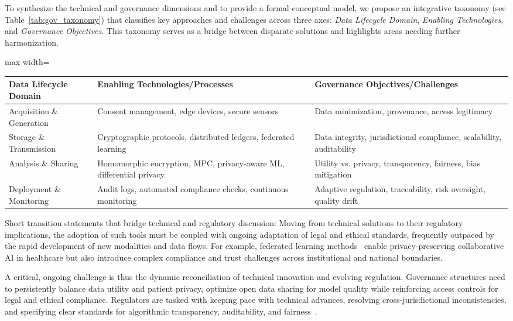 \documentclass[sigconf]{acmart}
\begin{document}
To synthesize the technical and governance dimensions and to provide a formal conceptual model, we propose an integrative taxonomy (see Table~\ref{tab:gov_taxonomy}) that classifies key approaches and challenges across three axes: \emph{Data Lifecycle Domain}, \emph{Enabling Technologies}, and \emph{Governance Objectives}. This taxonomy serves as a bridge between disparate solutions and highlights areas needing further harmonization.

\begin{table*}[htbp]
\centering
\caption{Taxonomy Bridging Technical and Governance Strategies in Digital Health Data Infrastructures}
\label{tab:gov_taxonomy}
\begin{adjustbox}{max width=\textwidth}
\begin{tabular}{@{}lll@{}}
\toprule
\textbf{Data Lifecycle Domain} & \textbf{Enabling Technologies/Processes} & \textbf{Governance Objectives/Challenges} \\
\midrule
Acquisition \& Generation & Consent management, edge devices, secure sensors & Data minimization, provenance, access legitimacy \\
Storage \& Transmission & Cryptographic protocols, distributed ledgers, federated learning & Data integrity, jurisdictional compliance, scalability, auditability \\
Analysis \& Sharing & Homomorphic encryption, MPC, privacy-aware ML, differential privacy & Utility vs. privacy, transparency, fairness, bias mitigation \\
Deployment \& Monitoring & Audit logs, automated compliance checks, continuous monitoring & Adaptive regulation, traceability, risk oversight, quality drift \\
\bottomrule
\end{tabular}
\end{adjustbox}
\end{table*}

Short transition statements that bridge technical and regulatory discussion: Moving from technical solutions to their regulatory implications, the adoption of such tools must be coupled with ongoing adaptation of legal and ethical standards, frequently outpaced by the rapid development of new modalities and data flows. For example, federated learning methods~\cite{ref51} enable privacy-preserving collaborative AI in healthcare but also introduce complex compliance and trust challenges across institutional and national boundaries.

A critical, ongoing challenge is thus the dynamic reconciliation of technical innovation and evolving regulation. Governance structures need to persistently balance data utility and patient privacy, optimize open data sharing for model quality while reinforcing access controls for legal and ethical compliance. Regulators are tasked with keeping pace with technical advances, resolving cross-jurisdictional inconsistencies, and specifying clear standards for algorithmic transparency, auditability, and fairness~\cite{ref91, ref106}.
\end{document}
